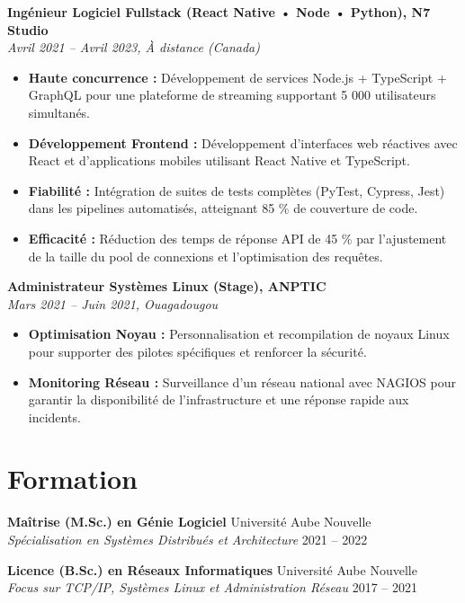 \documentclass[a4paper,10pt]{article}
\newcommand{\jobheader}[4]{%
    \textbf{#1, #2} \\
    \textit{#3, #4}
    \vspace{0.05cm}
}
\begin{document}
\vspace{0.15cm}

\jobheader{Ingénieur Logiciel Fullstack (React Native • Node • Python)}{N7 Studio}{Avril 2021 -- Avril 2023}{À distance (Canada)}
\begin{itemize}[leftmargin=*,nosep]
    \item \textbf{Haute concurrence :} Développement de services Node.js + TypeScript + GraphQL pour une plateforme de streaming supportant 5 000 utilisateurs simultanés.
    \item \textbf{Développement Frontend :} Développement d'interfaces web réactives avec React et d'applications mobiles utilisant React Native et TypeScript.
    \item \textbf{Fiabilité :} Intégration de suites de tests complètes (PyTest, Cypress, Jest) dans les pipelines automatisés, atteignant 85 \% de couverture de code.
    \item \textbf{Efficacité :} Réduction des temps de réponse API de 45 \% par l'ajustement de la taille du pool de connexions et l'optimisation des requêtes.
\end{itemize}

\vspace{0.15cm}

\jobheader{Administrateur Systèmes Linux (Stage)}{ANPTIC}{Mars 2021 -- Juin 2021}{Ouagadougou}
\begin{itemize}[leftmargin=*,nosep]
    \item \textbf{Optimisation Noyau :} Personnalisation et recompilation de noyaux Linux pour supporter des pilotes spécifiques et renforcer la sécurité.
    \item \textbf{Monitoring Réseau :} Surveillance d'un réseau national avec NAGIOS pour garantir la disponibilité de l'infrastructure et une réponse rapide aux incidents.
\end{itemize}

\section*{Formation}
\textbf{Maîtrise (M.Sc.) en Génie Logiciel} \hfill Université Aube Nouvelle \\
\textit{Spécialisation en Systèmes Distribués et Architecture} \hfill 2021 -- 2022

\vspace{0.1cm}

\textbf{Licence (B.Sc.) en Réseaux Informatiques} \hfill Université Aube Nouvelle \\
\textit{Focus sur TCP/IP, Systèmes Linux et Administration Réseau} \hfill 2017 -- 2021
\end{document}
